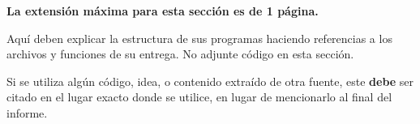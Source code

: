 \begin{mdframed}
    \textbf{La extensión máxima para esta sección es de 1 página.}
\end{mdframed}

Aquí deben explicar la estructura de sus programas haciendo referencias a los archivos y funciones de su entrega. No adjunte código en esta sección.
\begin{mdframed}
    Si se utiliza algún código, idea, o contenido extraído de otra fuente, este \textbf{debe} ser citado en el lugar exacto donde se utilice, en lugar de mencionarlo al final del informe.
\end{mdframed}
